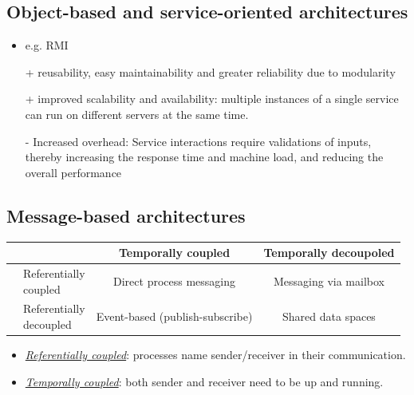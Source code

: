 \documentclass[twocolumn,landscape,10pt]{article}
\theoremstyle{definition}
\begin{document}
\subsection{Object-based and service-oriented architectures}
\begin{itemize}
    \item e.g. RMI
    \item[+] reusability, easy maintainability and greater reliability
        due to modularity
    \item[+] improved scalability and availability: multiple instances
        of a single service can run on different servers at the same
        time.
    \item[-] Increased overhead: Service interactions require
        validations of inputs, thereby increasing the response time and
        machine load, and reducing the overall performance
\end{itemize} 

\subsection{Message-based architectures}
\begin{table}[h]
    \centering
    \begin{tabular}{ll||c|c}
          & & Temporally coupled & Temporally decoupoled \\
        \hline\hline
        \rule{0pt}{20px} &
        \shortstack{Referentially \\coupled} & Direct process messaging & Messaging via
        mailbox \\
        \hline
        \rule{0pt}{20px} &
        \shortstack{Referentially \\decoupled} & Event-based (publish-subscribe) &
        Shared data spaces \\
    \end{tabular} 
\end{table} 
\begin{itemize}
    \item \underline{\emph{Referentially coupled}}: processes name
        sender/receiver in their communication.
    \item \underline{\emph{Temporally coupled}}: both sender and receiver need
        to be up and running.
\end{itemize} 
\end{document}

